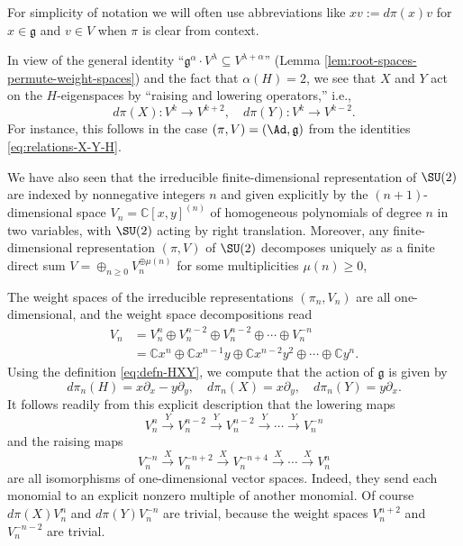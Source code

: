 \documentclass[reqno]{amsart} 
\begin{document}
For simplicity of notation we will often use abbreviations like $x v := d \pi(x) v$ for $x \in \mathfrak{g}$ and $v \in V$ when $\pi$ is clear from context.

In view of the general identity ``$\mathfrak{g}^\alpha \cdot V^{\lambda} \subseteq V^{\lambda+\alpha}$'' (Lemma \ref{lem:root-spaces-permute-weight-spaces}) and the fact that $\alpha(H) = 2$, we see that $X$ and $Y$ act on the $H$-eigenspaces by ``raising and lowering operators,'' i.e.,
\begin{equation*}
  d \pi(X) : V^k \rightarrow V^{k+2}, \quad d \pi(Y) : V^k
  \rightarrow V^{k-2}.
\end{equation*}
For instance, this follows in the case $(\pi,V) = (\Ad,\mathfrak{g})$ from the identities \eqref{eq:relations-X-Y-H}.

We have also seen that the irreducible finite-dimensional representation of $\SU(2)$ are indexed by nonnegative integers $n$ and given explicitly by the $(n+1)$-dimensional space $V_n = \mathbb{C}[x,y]^{(n)}$ of homogeneous polynomials of degree $n$ in two variables, with $\SU(2)$ acting by right translation.  Moreover, any finite-dimensional representation $(\pi,V)$ of $\SU(2)$ decomposes uniquely as a finite direct sum $V = \oplus_{n \geq 0} V_n^{\oplus \mu(n)}$ for some multiplicities $\mu(n) \geq 0$,

The weight spaces of the irreducible representations $(\pi_n,V_n)$ are all one-dimensional, and the weight space decompositions read
\begin{align*}
  V_n
  &=
    V_n^{n} \oplus V_n^{n-2} \oplus V_n^{n-2} \oplus \dotsb
    \oplus V_{n}^{-n}
  \\
  &=
    \mathbb{C} x^n
    \oplus \mathbb{C} x^{n-1} y
    \oplus \mathbb{C} x^{n-2} y^2
    \oplus \dotsb \oplus
    \mathbb{C} y^n.
\end{align*}
Using the definition \eqref{eq:defn-HXY}, we compute that the action of $\mathfrak{g}$ is given by
\begin{equation*}
  d \pi_n(H) = x \partial_x - y \partial _y,
  \quad d \pi_n(X)
  = x \partial_y,
  \quad
  d \pi_n(Y) = y \partial_x.
\end{equation*}
It follows readily from this explicit description that the lowering maps
\begin{equation*}
  V_n^n \xrightarrow{Y} V_n^{n-2}
  \xrightarrow{Y} V_n^{n-2} \xrightarrow{Y} \dotsb
  \xrightarrow{Y} V_n^{-n}
\end{equation*}
and the raising maps
\begin{equation}\label{eq:X-raising-isoms}
  V_n^{-n} \xrightarrow{X} V_n^{-n+2}
  \xrightarrow{X} V_n^{-n+4} \xrightarrow{X} \dotsb
  \xrightarrow{X} V_n^{n}
\end{equation}
are all isomorphisms of one-dimensional vector spaces.  Indeed, they send each monomial to an explicit nonzero multiple of another monomial.  Of course $d \pi(X) V_n^n$ and $d \pi(Y) V_n^{-n}$ are trivial, because the weight spaces $V_n^{n+2}$ and $V_n^{-n-2}$ are trivial.
\end{document}
